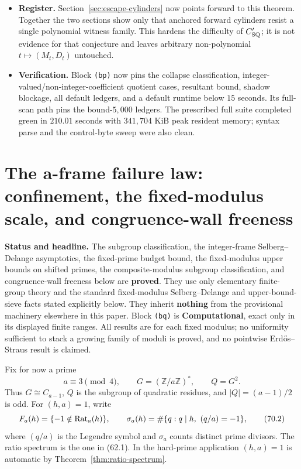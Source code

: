 \documentclass[10pt,reqno]{amsart}
\theoremstyle{definition}
\newcommand{\1}{\mathbf 1}
\begin{document}
\begin{itemize}[leftmargin=*]
sampling, supplies the all-degree anchored conclusion.
\item \textbf{Register.}  Section~\ref{sec:escape-cylinders} now points
forward to this theorem.  Together the two sections show only that anchored
forward cylinders resist a single polynomial witness family.  This hardens
the difficulty of $C_{\rm SQ}'$; it is not evidence for that conjecture and
leaves arbitrary non-polynomial $t\mapsto(M_t,D_t)$ untouched.
\item \textbf{Verification.}  Block \texttt{(bp)} now pins the collapse
classification, integer-valued/non-integer-coefficient quotient cases,
resultant bound, shadow blockage, all default ledgers, and a default runtime
below $15$ seconds.  Its full-scan path pins the bound-$5{,}000$ ledgers.
The prescribed full suite completed green in $210.01$ seconds with
$341{,}704$ KiB peak resident memory; syntax parse and the control-byte sweep
were also clean.
\end{itemize}

\section{The a-frame failure law: confinement, the fixed-modulus scale, and congruence-wall freeness}
\label{sec:a-frame-failure}

\medskip\noindent\textbf{Status and headline.}
The subgroup classification, the integer-frame
Selberg--Delange asymptotics, the fixed-prime budget bound, the fixed-modulus
upper bounds on shifted primes, the composite-modulus subgroup
classification, and congruence-wall freeness below are \textbf{proved}.  They use
only elementary finite-group theory and the standard fixed-modulus
Selberg--Delange and upper-bound-sieve facts stated explicitly below.  They
inherit \textbf{nothing} from the provisional machinery elsewhere in this paper.
Block \texttt{(bq)} is \textbf{Computational}, exact only in its displayed finite ranges.
All results are for each fixed modulus; no uniformity sufficient to stack a
growing family of moduli is proved, and no pointwise Erd\H{o}s--Straus result is
claimed.

Fix for now a prime
\begin{equation}
                    a\equiv3\pmod4,
 \qquad G=({\mathbb Z}/a{\mathbb Z})^*,
 \qquad Q=G^2.                                             \tag{70.1}
\end{equation}
Thus $G\cong C_{a-1}$, $Q$ is the subgroup of quadratic residues, and
$|Q|=(a-1)/2$ is odd.  For $(h,a)=1$, write
\begin{equation}
 F_a(h)=\{-1\notin {\rm Rat}_a(h)\},\qquad
 \sigma_a(h)=\#\{q:q\mid h,\ (q/a)=-1\},                 \tag{70.2}
\end{equation}
where $(q/a)$ is the Legendre symbol and $\sigma_a$ counts distinct
prime divisors.  The ratio spectrum is the one in (62.1).  In the
hard-prime application $(h,a)=1$ is automatic by Theorem~\ref{thm:ratio-spectrum}.
\end{document}
